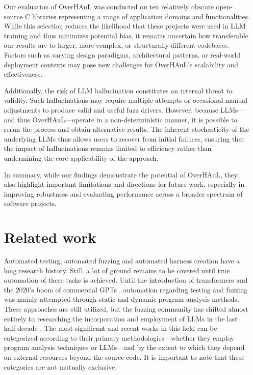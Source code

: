 \documentclass[
  a4paper,
]{scrreprt}
\theoremstyle{definition}
\theoremstyle{remark}
\begin{document}
Our evaluation of OverHAuL was conducted on ten relatively obscure
open-source C libraries representing a range of application domains and
functionalities. While this selection reduces the likelihood that these
projects were used in LLM training and thus minimizes potential bias, it
remains uncertain how transferable our results are to larger, more
complex, or structurally different codebases. Factors such as varying
design paradigms, architectural patterns, or real-world deployment
contexts may pose new challenges for OverHAuL's scalability and
effectiveness.

Additionally, the risk of LLM hallucination constitutes an internal
threat to validity. Such hallucinations may require multiple attempts or
occasional manual adjustments to produce valid and useful fuzz drivers.
However, because LLMs---and thus OverHAuL---operate in a
non-deterministic manner, it is possible to rerun the process and obtain
alternative results. The inherent stochasticity of the underlying LLMs
thus allows users to recover from initial failures, ensuring that the
impact of hallucinations remains limited to efficiency rather than
undermining the core applicability of the approach.

In summary, while our findings demonstrate the potential of OverHAuL,
they also highlight important limitations and directions for future
work, especially in improving robustness and evaluating performance
across a broader spectrum of software projects.


\chapter{Related work}\label{sec-related}

Automated testing, automated fuzzing and automated harness creation have
a long research history. Still, a lot of ground remains to be covered
until true automation of these tasks is achieved. Until the introduction
of transformers \autocite{vaswani2023} and the 2020's boom of commercial
GPTs \autocite{chatgpt}, automation regarding testing and fuzzing was
mainly attempted through static and dynamic program analysis methods.
These approaches are still utilized, but the fuzzing community has
shifted almost entirely to researching the incorporation and employment
of LLMs in the last half decade
\autocite{iris,sun2024,prophetfuzz,oss-fuzz-gen,green2022,utopia,fuzzgpt,titanfuzz,fuzzgen,fudge}.
The most significant and recent works in this field can be categorized
according to their primary methodologies---whether they employ program
analysis techniques or LLMs---and by the extent to which they depend on
external resources beyond the source code. It is important to note that
these categories are not mutually exclusive.
\end{document}
